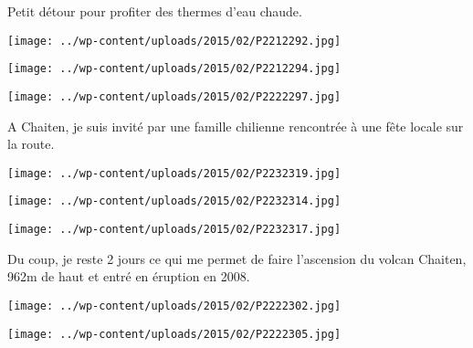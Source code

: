 Petit détour pour profiter des thermes d'eau chaude.

 

\begin{center} \texttt{[image: ../wp-content/uploads/2015/02/P2212292.jpg]} \end{center}



\begin{center} \texttt{[image: ../wp-content/uploads/2015/02/P2212294.jpg]} \end{center}

 

\begin{center} \texttt{[image: ../wp-content/uploads/2015/02/P2222297.jpg]} \end{center}

A Chaiten, je suis invité par une famille chilienne rencontrée à une fête locale sur la route.

 

\begin{center} \texttt{[image: ../wp-content/uploads/2015/02/P2232319.jpg]} \end{center}

 

\begin{center} \texttt{[image: ../wp-content/uploads/2015/02/P2232314.jpg]} \end{center}

 

\begin{center} \texttt{[image: ../wp-content/uploads/2015/02/P2232317.jpg]} \end{center}

Du coup, je reste 2 jours ce qui me permet de faire l'ascension du volcan Chaiten, 962m de haut et entré en éruption en 2008.

 

\begin{center} \texttt{[image: ../wp-content/uploads/2015/02/P2222302.jpg]} \end{center}

  

  

\begin{center} \texttt{[image: ../wp-content/uploads/2015/02/P2222305.jpg]} \end{center}

 

